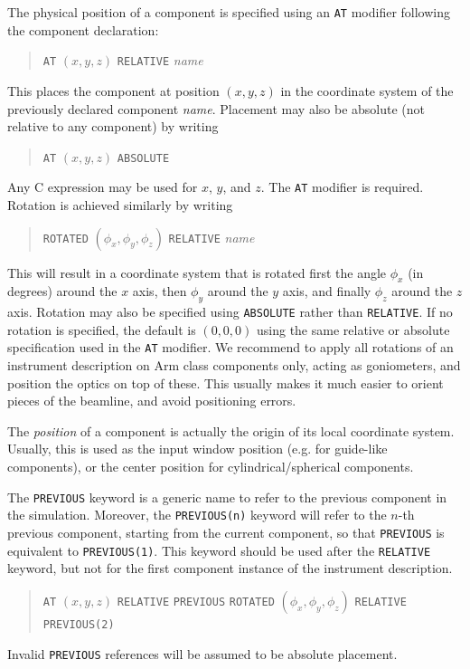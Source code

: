 The physical position of a component is specified using an \texttt{AT} modifier
following the component declaration:
  
\begin{quote}
  \texttt{AT} $(x,y,z)$ \texttt{RELATIVE} \textit{name}
\end{quote}
This places the component at position $(x,y,z)$ in the coordinate system
of the previously declared component \textit{name}. Placement may also
be absolute (not relative to any component) by writing
\begin{quote}
  \texttt{AT} $(x,y,z)$ \texttt{ABSOLUTE}
\end{quote}
Any C expression may be used for $x$, $y$, and $z$. The \texttt{AT}
modifier is required.
Rotation is achieved similarly by writing 
\begin{quote}
  \texttt{ROTATED} $(\phi_x,\phi_y,\phi_z)$ \texttt{RELATIVE} \textit{name}
\end{quote}
This will result in a coordinate system that is rotated first the angle $\phi_x$ (in degrees) around the $x$ axis, then $\phi_y$ around the $y$ axis, and finally
$\phi_z$ around the $z$ axis. Rotation may also be specified using \texttt{ABSOLUTE} rather than \texttt{RELATIVE}. If no rotation is
specified, the default is $(0,0,0)$ using the same relative or absolute specification used in the \texttt{AT} modifier. We recommend to apply all rotations of an instrument
description on Arm class components only, acting as goniometers, and position the optics on top of these. This usually makes it much easier to orient pieces of the beamline, and
avoid positioning errors.

The \emph{position} of a component is actually the origin of its local coordinate system. Usually, this is used as the input window position (e.g. for guide-like components), or
the center position for cylindrical/spherical components.

The \texttt{PREVIOUS}  keyword is a generic name to refer to the previous component in the simulation. Moreover, the \texttt{PREVIOUS(n)} keyword will refer
to the $n$-th previous component, starting from the current component, so that \texttt{PREVIOUS} is equivalent to \texttt{PREVIOUS(1)}. This keyword should be used after the
\texttt{RELATIVE} keyword, but not for the first component instance of the instrument description.
\begin{quote}
  \texttt{AT} $(x,y,z)$ \texttt{RELATIVE} \texttt{PREVIOUS}
  \texttt{ROTATED} $(\phi_x,\phi_y,\phi_z)$ \texttt{RELATIVE} \texttt{PREVIOUS(2)}
\end{quote}
Invalid \texttt{PREVIOUS} references will be assumed to be absolute placement.

